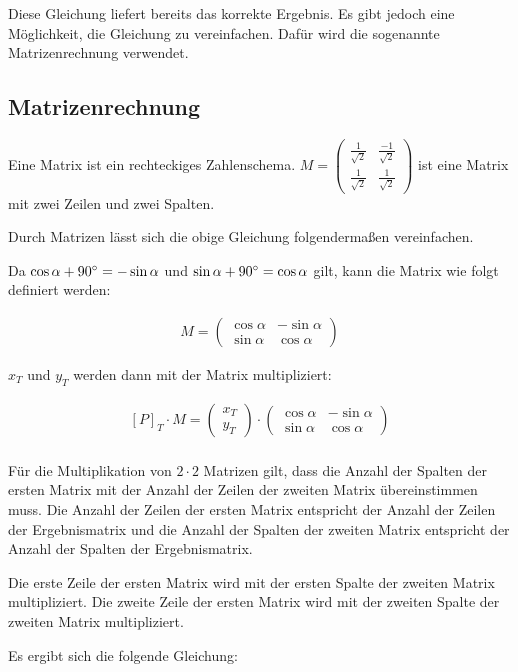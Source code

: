 \documentclass{article}
\newcommand{\m}[1]{\begin{pmatrix}#1\end{pmatrix}}
\begin{document}
    Diese Gleichung liefert bereits das korrekte Ergebnis. Es gibt jedoch eine Möglichkeit, die Gleichung zu vereinfachen.
    Dafür wird die sogenannte Matrizenrechnung verwendet.

    \subsection{Matrizenrechnung}

    Eine Matrix ist ein rechteckiges Zahlenschema.
    $M = \m{\frac{1}{\sqrt{2}} & \frac{-1}{\sqrt{2}} \\ \frac{1}{\sqrt{2}} & \frac{1}{\sqrt{2}}}$ ist eine Matrix
    mit zwei Zeilen und zwei Spalten.

    Durch Matrizen lässt sich die obige Gleichung folgendermaßen vereinfachen.

    Da $\cos \alpha + 90 \degree = - \sin \alpha$ und $\sin \alpha + 90 \degree = \cos \alpha$ gilt,
    kann die Matrix wie folgt definiert werden:

    \[
        \begin{split}
            M = \m{\cos \alpha & - \sin \alpha \\ \sin \alpha & \cos \alpha}
        \end{split}
    \]

    $x_T$ und $y_T$ werden dann mit der Matrix multipliziert:

    \[
        \begin{split}
            {[P]}_{T} \cdot M = \m{x_T \\ y_T} \cdot \m{\cos \alpha & - \sin \alpha \\ \sin \alpha & \cos \alpha} \\
        \end{split}
    \]

    Für die Multiplikation von $2 \cdot 2$ Matrizen gilt, dass die Anzahl der Spalten der ersten Matrix
    mit der Anzahl der Zeilen der zweiten Matrix übereinstimmen muss. Die Anzahl der Zeilen der ersten Matrix
    entspricht der Anzahl der Zeilen der Ergebnismatrix und die Anzahl der Spalten der zweiten Matrix entspricht
    der Anzahl der Spalten der Ergebnismatrix.

    Die erste Zeile der ersten Matrix wird mit der ersten Spalte der zweiten Matrix multipliziert.
    Die zweite Zeile der ersten Matrix wird mit der zweiten Spalte der zweiten Matrix multipliziert.

    Es ergibt sich die folgende Gleichung:
\end{document}
